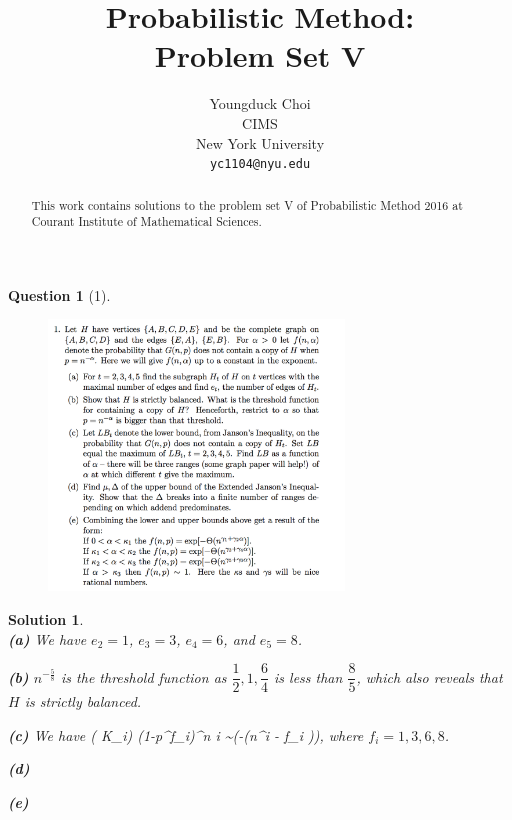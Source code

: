 \documentclass{article} %
\title{Probabilistic Method: \\
Problem Set V}
\author{
Youngduck Choi \\
CIMS \\
New York University\\
\texttt{yc1104@nyu.edu} \\
}
\def\eQb#1\eQe{\begin{eqnarray*}#1\end{eqnarray*}}
\theoremstyle{quest}
\newtheorem*{question}{Question}
\newtheorem*{solution}{Solution}
\begin{document}
\maketitle

\begin{abstract}
This work contains solutions to the problem set V
of Probabilistic Method 2016 at Courant Institute of Mathematical Sciences.
\end{abstract}

\bigskip

\begin{question}[1]
\hfill
\begin{figure}[h!]
  \centering
    \includegraphics[width=0.7\textwidth]{pm-5-1.png}
\end{figure}
\end{question}
\newpage
\begin{solution} \hfill \\
\textbf{(a)} We have $e_2 = 1$, $e_3 = 3$, $e_4 = 6$, and $e_5 = 8$.  

\bigskip

\textbf{(b)} $n^{-\frac{5}{8}}$ is the threshold function as $\dfrac{1}{2}, 1, \dfrac{6}{4}$ 
is less than $\dfrac{8}{5}$, which also reveals that $H$ is strictly balanced.

\bigskip

\textbf{(c)} We have
\eQb
P( K_i) \leq (1-p^{f_i})^{{n \choose i}} \sim \exp(-\Theta(n^i - f_i \alpha )),  
\eQe
where $f_i = 1,3,6,8$. 

\bigskip

\textbf{(d)}

\bigskip

\textbf{(e)} 

\end{solution}
\end{document}
